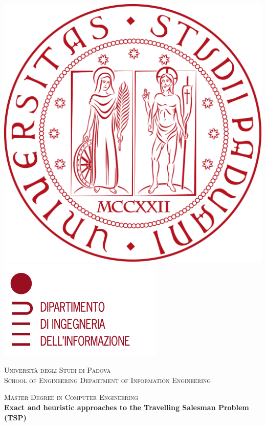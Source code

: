 \documentclass[a4paper,12pt]{report}
\begin{document}
\begin{titlepage}
\begin{center}

\includegraphics[height=0.13\textheight]{logo_unipd.png}
\hfill
\includegraphics[height=0.13\textheight]{logo_dei.png}
\newline
\newline

\vspace{0.8cm}
\textsc{\LARGE Universit\`{a} degli Studi di Padova}\\
\vspace{1.6cm}
\textsc{\large 	School of Engineering Department of Information Engineering}\\
\vspace{0.4cm}

\textsc{\large Master Degree in Computer Engineering}\\
\vfill
{ \LARGE \bfseries Exact and heuristic approaches to the Travelling Salesman Problem (TSP)}\\
\vspace{1cm}


\end{center}
\end{titlepage}
\end{document}
